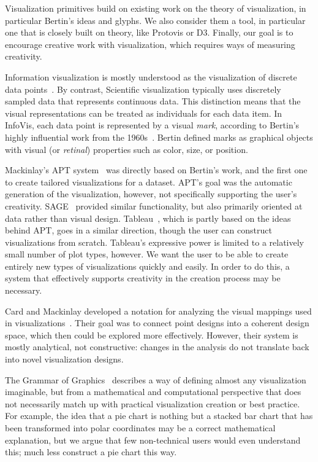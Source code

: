\label{relatedWork}
Visualization primitives build on existing work on the theory of visualization, in particular Bertin's ideas and glyphs. We also consider them a tool, in particular one that is closely built on theory, like Protovis or D3. Finally, our goal is to encourage creative work with visualization, which requires ways of measuring creativity.

\label{theory}

Information visualization is mostly understood as the visualization of discrete data points~\cite{tory2004rethinking}.
By contrast, Scientific visualization typically uses discretely sampled data that represents continuous data.
This distinction means that the visual representations can be treated as individuals for each data item.
In InfoVis, each data point is represented by a visual \textit{mark}, according to Bertin's highly influential work from the 1960s~\cite{bertin1983semiology}.
Bertin defined marks as graphical objects with visual (or \textit{retinal}) properties such as color, size, or position.

Mackinlay's APT system~\cite{Mackinlay1986} was directly based on Bertin's work, and the first one to create tailored visualizations for a dataset.
APT's goal was the automatic generation of the visualization, however, not specifically supporting the user's creativity.
SAGE~\cite{Roth:CHI:1994} provided similar functionality, but also primarily oriented at data rather than visual design.
Tableau~\cite{stolte2002polaris}, which is partly based on the ideas behind APT, goes in a similar direction, though the user can construct visualizations from scratch.
Tableau's expressive power is  limited to a relatively small number of plot types, however.
We want the user to be able to create entirely new types of visualizations quickly and easily.
In order to do this, a system that effectively supports creativity in the creation process may be necessary.

Card and Mackinlay developed a notation for analyzing the visual mappings used in visualizations~\cite{Card1997}.
Their goal was to connect point designs into a coherent design space, which then could be explored more effectively.
However, their system is mostly analytical, not constructive: changes in the analysis do not translate back into novel visualization designs.

The Grammar of Graphics~\cite{Wickham:JCGS:2010,Wilkinson2005c} describes a way of defining almost any visualization imaginable, but from a mathematical and computational perspective that does not necessarily match up with practical visualization creation or best practice.
For example, the idea that a pie chart is nothing but a stacked bar chart that has been transformed into polar coordinates may be a correct mathematical explanation, but we argue that few non-technical users would even understand this; much less construct a pie chart this way.

